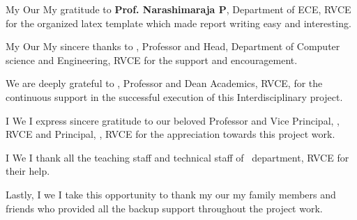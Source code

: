 \ifPG My \else \ifStuNameBUsed Our \else My \fi\fi gratitude to \textbf{Prof. Narashimaraja P}, Department of ECE, RVCE for the organized latex template which made report writing easy and interesting.\\ \par


\ifPG My \else \ifStuNameBUsed Our \else My \fi\fi sincere thanks to \textbf{\printHOD}, Professor and Head, Department of \ifIDP Computer science and Engineering\else\printDepartmentLF\fi, RVCE for the support and encouragement.\\ \par

\ifIDP
We are deeply grateful to \textbf{\printDA}, Professor and Dean Academics, RVCE, for the continuous support in the successful execution of this Interdisciplinary project.
\\ \par
\fi
\ifPG I \else \ifStuNameBUsed We \else I \fi\fi express sincere gratitude to our beloved Professor and Vice Principal, \textbf{\printVicePrincipal}, RVCE and Principal, \textbf{\printPrincipal}, RVCE for the appreciation towards this project work.\\ \par

\ifIDP \else\ifPG I \else\ifStuNameBUsed We \else I \fi\fi thank all the teaching staff and technical staff of \ifIDP \printGuideDeptAInLF\else\printDepartmentLF\fi\, department, RVCE for their help.\\ \par \fi

Lastly, \ifPG I \else\ifStuNameBUsed we \else I \fi\fi take this opportunity to thank \ifPG my \else\ifStuNameBUsed our \else my \fi\fi family members and friends who provided all the backup support throughout the project work.\\ \par